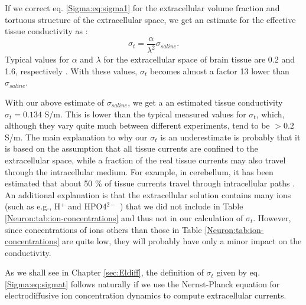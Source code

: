 If we correct eq. \ref{Sigma:eq:sigma1} for the extracellular volume fraction and tortuous structure of the extracellular space, we get an estimate for the effective tissue conductivity as \citep{Okada1994}:
\begin{equation}
\sigma_{t} = \frac{\alpha}{\lambda^2} \sigma_{saline}.
\label{Sigma:eq:sigmat}
\end{equation}
Typical values for $\alpha$ and $\lambda$ for the extracellular space of brain tissue are 0.2 and 1.6, respectively \citep{Nicholson1981, Nicholson1998}. With these values, $\sigma_t$ becomes almost a factor 13 lower than $\sigma_{saline}$. 

With our above estimate of $\sigma_{saline}$, we get a an estimated tissue conductivity $\sigma_t = 0.134$ S/m. This is lower than the typical measured values for $\sigma_t$, which, although they vary quite much between different experiments, tend to be $> 0.2$ S/m. The main explanation to why our $\sigma_t$ is an underestimate is probably that it is based on the assumption that all tissue currents are confined to the extracellular space, while a fraction of the real tissue currents may also travel through the intracellular medium. For example, in cerebellum, it has been estimated that about 50 \% of tissue currents travel through intracellular paths \citep{Okada1994}. An additional explanation is that the extracellular solution contains many ions (such as e.g., H$^+$ and HPO4$^{2-}$ ) that we did not include in Table \ref{Neuron:tab:ion-concentrations} and thus not in our calculation of $\sigma_t$. However, since concentrations of ions others than those in Table \ref{Neuron:tab:ion-concentrations} are quite low, they will probably have only a minor impact on the conductivity. 

As we shall see in Chapter \ref{sec:Eldiff}, the definition of $\sigma_t$ given by eq. \ref{Sigma:eq:sigmat} follows naturally if we use the Nernst-Planck equation for electrodiffusive ion concentration dynamics to compute extracellular currents. 
